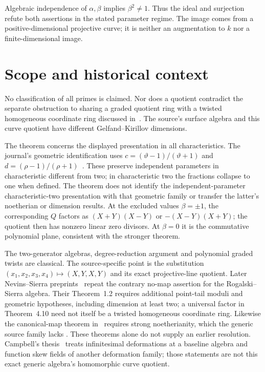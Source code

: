 \documentclass[11pt]{article}
\begin{document}
Algebraic independence of \(\alpha,\beta\) implies \(\beta^2\ne1\).
Thus the ideal and surjection refute both assertions in the stated
parameter regime. The image comes from a positive-dimensional
projective curve; it is neither an augmentation to \(k\) nor a
finite-dimensional image.

\section{Scope and historical context}
No classification of all primes is claimed. Nor does a quotient
contradict the separate obstruction to sharing a graded quotient ring
with a twisted homogeneous coordinate ring discussed in~\cite[p.~1198]{RS}.
The source's surface algebra and this curve quotient have different
Gelfand--Kirillov dimensions.

The theorem concerns the displayed presentation in all characteristics.
The journal's geometric identification uses
\(c=(\vartheta-1)/(\vartheta+1)\) and
\(d=(\rho-1)/(\rho+1)\)~\cite[Theorem~3.5]{RS}.
These preserve independent parameters in characteristic different from
two; in characteristic two the fractions collapse to one when defined.
The theorem does not identify the independent-parameter
characteristic-two presentation with that geometric family or transfer
the latter's noetherian or dimension results.
At the excluded values \(\beta=\pm1\), the corresponding \(Q\) factors
as \((X+Y)(X-Y)\) or \(-(X-Y)(X+Y)\); the quotient then has nonzero
linear zero divisors. At \(\beta=0\) it is the commutative polynomial
plane, consistent with the stronger theorem.

The two-generator algebras, degree-reduction argument and polynomial
graded twists are classical. The source-specific point is the
substitution \((x_1,x_2,x_3,x_4)\mapsto(X,Y,X,Y)\) and its exact
projective-line quotient.
Later Nevins--Sierra preprints~\cite[v1, p.~25; v2, pp.~28--29]{NS}
repeat the contrary no-map assertion for the Rogalski--Sierra algebra.
Their Theorem~1.2 requires additional point-tail moduli and geometric
hypotheses, including dimension at least two; a universal factor in
Theorem~4.10 need not itself be a twisted homogeneous coordinate ring.
Likewise the canonical-map theorem in~\cite{RZ} requires strong
noetherianity, which the generic source family lacks
\cite[p.~1236]{RS}. These theorems alone do not supply an earlier
resolution. Campbell's thesis~\cite[Chapter~6 and \S8.2]{Campbell}
treats infinitesimal deformations at a baseline algebra and function
skew fields of another deformation family; those statements are not
this exact generic algebra's homomorphic curve quotient.
\end{document}
